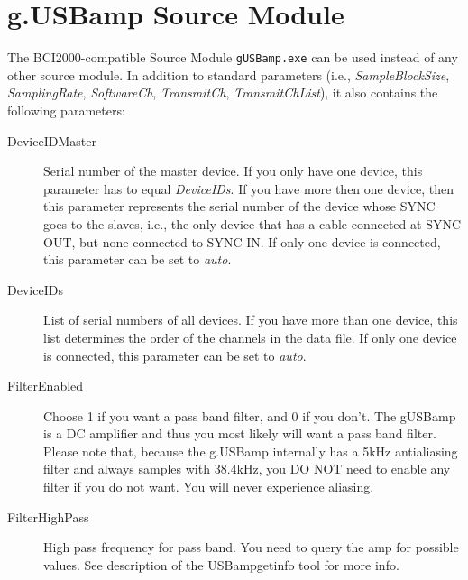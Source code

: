 \documentclass[letterpaper, oneside, 12pt]{article}
\newcommand{\ie}{i.e.,}
\begin{document}
\section{g.USBamp Source Module}

The BCI2000-compatible Source Module \texttt{gUSBamp.exe} can be used instead of 
any other source module. In addition to standard parameters (\ie{} 
\emph{SampleBlockSize}, \emph{SamplingRate}, \emph{SoftwareCh}, 
\emph{TransmitCh}, \emph{TransmitChList}), it also contains the following 
parameters:

\begin{description}
 \item [DeviceIDMaster] Serial number of the master device. 
                        If you only have one device, this 
                        parameter has to equal \emph{DeviceIDs}.
                        If you have more then one device, then
                        this parameter represents the serial
                        number of the device whose SYNC goes to
                        the slaves, i.e., the only device that 
                        has a cable connected at SYNC OUT, but 
                        none connected to SYNC IN. If only one
                        device is connected, this parameter
                        can be set to \emph{auto}.
 \item [DeviceIDs]      List of serial numbers of all devices.
                        If you have more than one device, this 
                        list determines the order of
                        the channels in the data file. If only one
                        device is connected, this parameter
                        can be set to \emph{auto}.
 \item [FilterEnabled]  Choose 1 if you want a pass band filter,
                        and 0 if you don't. The gUSBamp is a 
                        DC amplifier and thus you most likely
                        will want a pass band filter. Please note
                        that, because the g.USBamp internally has
                        a 5kHz antialiasing filter and always samples
                        with 38.4kHz, you DO NOT need to enable any
                        filter if you do not want. You will never
                        experience aliasing.
 \item [FilterHighPass] High pass frequency for pass band. You need to query
                        the amp for possible values. See description
                        of the USBampgetinfo tool for more info.

\end{description}
\end{document}

